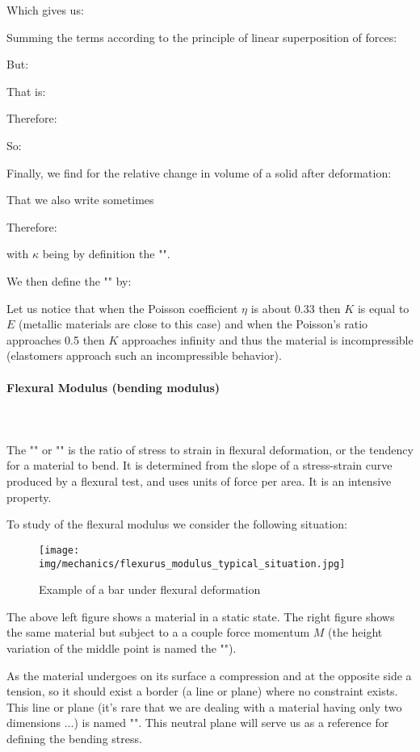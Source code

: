 	Which gives us:
	
	Summing the terms according to the principle of linear superposition of forces:
	
	But:
	
	That is:
	
	Therefore:
	
	So:
	
	Finally, we find for the relative change in volume of a solid after deformation:
	
	That we also write sometimes
	
	Therefore:
	
	with $\kappa$ being by definition the  "".

	We then define the "" by:
	
	Let us notice that when the Poisson coefficient $\eta$ is about $0.33$ then $K$ is equal to $E$ (metallic materials are close to this case) and when the Poisson's ratio approaches $0.$5 then $K$ approaches infinity and thus the material is incompressible (elastomers approach such an incompressible behavior).
	
	\pagebreak
	\paragraph{Flexural Modulus (bending modulus)}\mbox{}\\\\
	The "" or "" is the ratio of stress to strain in flexural deformation, or the tendency for a material to bend. It is determined from the slope of a stress-strain curve produced by a flexural test, and uses units of force per area. It is an intensive property.
	
	To study of the flexural modulus we consider the following situation:
	\begin{figure}[H]
		\centering
		\texttt{[image: img/mechanics/flexurus\_modulus\_typical\_situation.jpg]}
		\caption[]{Example of a bar under flexural deformation}
	\end{figure}
	The above left figure shows a material in a static state. The right figure shows the same material but subject to a a couple force momentum $M$ (the height variation of the middle point is named the "").
	
	As the material undergoes on its surface a compression and at the opposite side a tension, so it should exist a border (a line or plane) where no constraint exists. This line or plane (it's rare that we are dealing with a material having only two dimensions ...) is named "". This neutral plane will serve us  as a reference for defining the bending stress.
	
